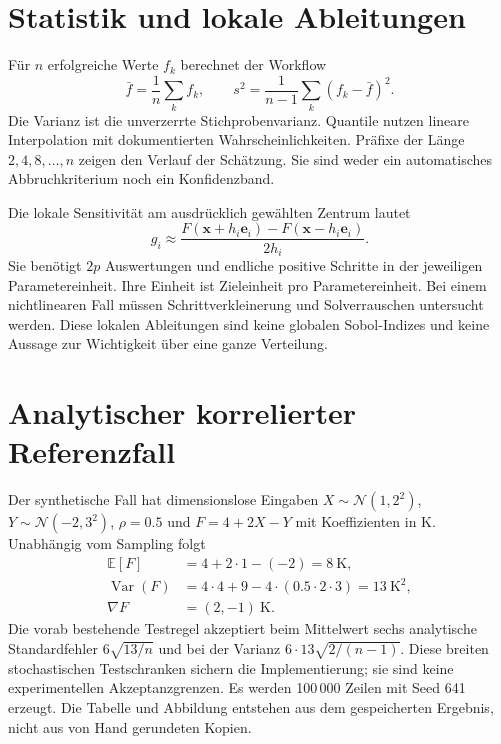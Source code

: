 \section{Statistik und lokale Ableitungen}
Für $n$ erfolgreiche Werte $f_k$ berechnet der Workflow
\begin{equation}
 \bar f=\frac1n\sum_k f_k,\qquad
 s^2=\frac1{n-1}\sum_k(f_k-\bar f)^2.
\end{equation}
Die Varianz ist die unverzerrte Stichprobenvarianz. Quantile nutzen lineare
Interpolation mit dokumentierten Wahrscheinlichkeiten. Präfixe der Länge
$2,4,8,\ldots,n$ zeigen den Verlauf der Schätzung. Sie sind weder ein
automatisches Abbruchkriterium noch ein Konfidenzband.

Die lokale Sensitivität am ausdrücklich gewählten Zentrum lautet
\begin{equation}
 g_i\approx\frac{F(\mathbf x+h_i\mathbf e_i)-F(\mathbf x-h_i\mathbf e_i)}{2h_i}.
\end{equation}
Sie benötigt $2p$ Auswertungen und endliche positive Schritte in der jeweiligen
Parametereinheit. Ihre Einheit ist Zieleinheit pro Parametereinheit. Bei einem
nichtlinearen Fall müssen Schrittverkleinerung und Solverrauschen untersucht
werden. Diese lokalen Ableitungen sind keine globalen Sobol-Indizes und keine
Aussage zur Wichtigkeit über eine ganze Verteilung.

\section{Analytischer korrelierter Referenzfall}
Der synthetische Fall hat dimensionslose Eingaben
$X\sim\mathcal N(1,2^2)$, $Y\sim\mathcal N(-2,3^2)$, $\rho=0.5$ und
$F=4+2X-Y$ mit Koeffizienten in K. Unabhängig vom Sampling folgt
\begin{align}
 \mathbb E[F]&=4+2\cdot1-(-2)=8\ \mathrm K,\\
 \operatorname{Var}(F)&=4\cdot4+9-4\cdot(0.5\cdot2\cdot3)
 =13\ \mathrm K^2,\\
 \nabla F&=(2,-1)\ \mathrm K.
\end{align}
Die vorab bestehende Testregel akzeptiert beim Mittelwert sechs analytische
Standardfehler $6\sqrt{13/n}$ und bei der Varianz
$6\cdot13\sqrt{2/(n-1)}$. Diese breiten stochastischen Testschranken sichern
die Implementierung; sie sind keine experimentellen Akzeptanzgrenzen.
Es werden 100\,000 Zeilen mit Seed 641 erzeugt. Die Tabelle und Abbildung
entstehen aus dem gespeicherten Ergebnis, nicht aus von Hand gerundeten Kopien.

